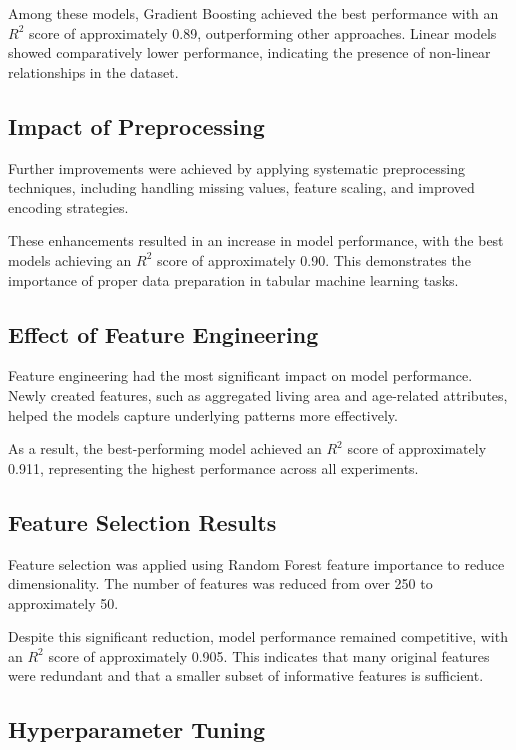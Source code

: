 \documentclass[conference]{IEEEtran}
\begin{document}
Among these models, Gradient Boosting achieved the best performance with an $R^2$ score of approximately 0.89, outperforming other approaches. Linear models showed comparatively lower performance, indicating the presence of non-linear relationships in the dataset.

\subsection{Impact of Preprocessing}

Further improvements were achieved by applying systematic preprocessing techniques, including handling missing values, feature scaling, and improved encoding strategies.

These enhancements resulted in an increase in model performance, with the best models achieving an $R^2$ score of approximately 0.90. This demonstrates the importance of proper data preparation in tabular machine learning tasks.

\subsection{Effect of Feature Engineering}

Feature engineering had the most significant impact on model performance. Newly created features, such as aggregated living area and age-related attributes, helped the models capture underlying patterns more effectively.

As a result, the best-performing model achieved an $R^2$ score of approximately 0.911, representing the highest performance across all experiments.

\subsection{Feature Selection Results}

Feature selection was applied using Random Forest feature importance to reduce dimensionality. The number of features was reduced from over 250 to approximately 50.

Despite this significant reduction, model performance remained competitive, with an $R^2$ score of approximately 0.905. This indicates that many original features were redundant and that a smaller subset of informative features is sufficient.

\subsection{Hyperparameter Tuning}
\end{document}
